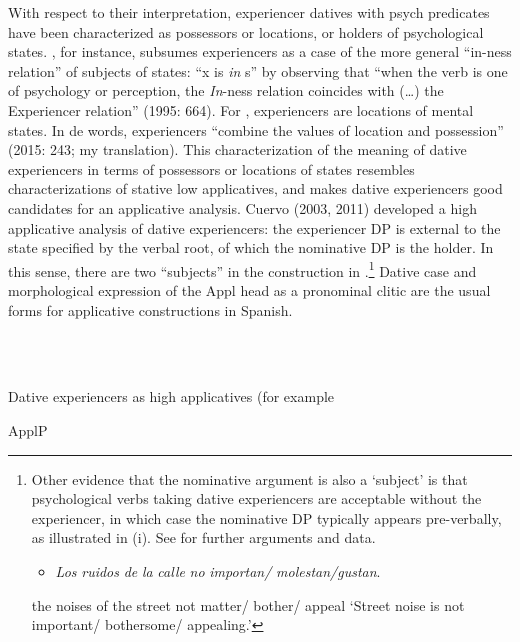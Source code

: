 \documentclass[output=paper,modfonts,nonflat]{langsci/langscibook}
\begin{document}
With respect to their interpretation, experiencer datives with psych predicates have been characterized as possessors or locations, or holders of psychological states. \citet{Parsons1995}, for instance, subsumes experiencers as a case of the more general “in-ness relation” of subjects of states: “x is \textit{in} s” by observing that “when the verb is one of psychology or perception, the \textit{In}{}-ness relation coincides with (…) the Experiencer relation” (1995: 664). For \citet{Landau2010}, experiencers are locations of mental states. In de  words, experiencers “combine the values of location and possession” (2015: 243; my translation). This characterization of the meaning of dative experiencers in terms of possessors or locations of states resembles characterizations of stative low applicatives, and makes dative experiencers good candidates for an applicative analysis. Cuervo (2003, 2011) developed a high applicative analysis of dative experiencers: the experiencer DP is external to the state specified by the verbal root, of which the nominative DP is the holder. In this sense, there are two “subjects” in the construction in .\footnote{Other evidence that the nominative argument is also a ‘subject’ is that psychological verbs taking dative experiencers are acceptable without the experiencer, in which case the nominative DP typically appears pre-verbally, as illustrated in (i). See \citealt{Cuervo2011} for further arguments and data.

\begin{itemize}
\item \begin{styleFootnote}
\textit{Los} \textit{ruidos} \textit{de} \textit{la} \textit{calle} \textit{no} \textit{importan/} \textit{molestan/gustan}.  
\end{styleFootnote}
\end{itemize}
         the noises of the street not matter/ bother/ appeal               ‘Street noise is not important/ bothersome/ appealing.’} Dative case and morphological expression of the Appl head as a pronominal clitic are the usual forms for applicative constructions in Spanish. 

\ea%
    \label{ex:key:15}
    \gll\\
        \\
    \glt
    \z

         Dative experiencers as high applicatives (for example 

\begin{styleNormalWeb}
               ApplP
\end{styleNormalWeb}
\end{document}
